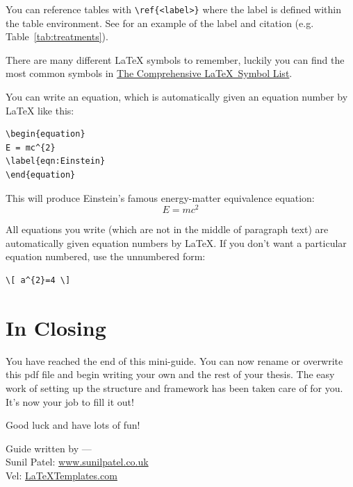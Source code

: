 You can reference tables with \verb|\ref{<label>}| where the label is defined within the table environment. See  for an example of the label and citation (e.g. Table~\ref{tab:treatments}).


There are many different \LaTeX{} symbols to remember, luckily you can find the most common symbols in \href{http://ctan.org/pkg/comprehensive}{The Comprehensive \LaTeX~Symbol List}.

You can write an equation, which is automatically given an equation number by \LaTeX{} like this:
\begin{verbatim}
\begin{equation}
E = mc^{2}
\label{eqn:Einstein}
\end{equation}
\end{verbatim}

This will produce Einstein's famous energy-matter equivalence equation:
\begin{equation}
E = mc^{2}
\label{eqn:Einstein}
\end{equation}

All equations you write (which are not in the middle of paragraph text) are automatically given equation numbers by \LaTeX{}. If you don't want a particular equation numbered, use the unnumbered form:
\begin{verbatim}
\[ a^{2}=4 \]
\end{verbatim}


\section{In Closing}

You have reached the end of this mini-guide. You can now rename or overwrite this pdf file and begin writing your own  and the rest of your thesis. The easy work of setting up the structure and framework has been taken care of for you. It's now your job to fill it out!

Good luck and have lots of fun!

\begin{flushright}
Guide written by ---\\
Sunil Patel: \href{http://www.sunilpatel.co.uk}{www.sunilpatel.co.uk}\\
Vel: \href{http://www.LaTeXTemplates.com}{LaTeXTemplates.com}
\end{flushright}
